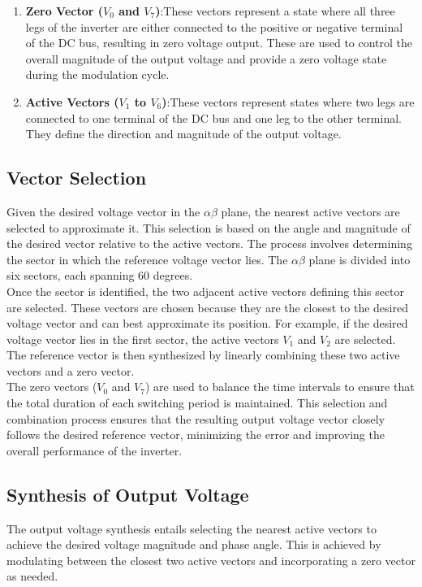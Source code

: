 \begin{enumerate}
    \item \textbf{Zero Vector ($V_0$ and $V_7$)}:These vectors represent a state where all three legs of the inverter are either connected to the positive or negative terminal of the DC bus, resulting in zero voltage output. These are used to control the overall magnitude of the output voltage and provide a zero voltage state during the modulation cycle.
    \item \textbf{Active Vectors ($V_1$ to $V_6$)}:These vectors represent states where two legs are connected to one terminal of the DC bus and one leg to the other terminal. They define the direction and magnitude of the output voltage.
\end{enumerate}

\subsection{Vector Selection}
Given the desired voltage vector in the $\alpha\beta$ plane, the nearest active
vectors are selected to approximate it. This selection is based on the angle
and magnitude of the desired vector relative to the active vectors. The process
involves determining the sector in which the reference voltage vector lies. The
$\alpha\beta$ plane is divided into six sectors, each spanning 60 degrees.\\

Once the sector is identified, the two adjacent active vectors defining this
sector are selected. These vectors are chosen because they are the closest to
the desired voltage vector and can best approximate its position. For example,
if the desired voltage vector lies in the first sector, the active vectors
$V_1$ and $V_2$ are selected. The reference vector is then synthesized by
linearly combining these two active vectors and a zero vector.\\

The zero vectors ($V_0$ and $V_7$) are used to balance the time intervals to
ensure that the total duration of each switching period is maintained. This
selection and combination process ensures that the resulting output voltage
vector closely follows the desired reference vector, minimizing the error and
improving the overall performance of the inverter.

\subsection{Synthesis of Output Voltage}
The output voltage synthesis entails selecting the nearest active vectors to
achieve the desired voltage magnitude and phase angle. This is achieved by
modulating between the closest two active vectors and incorporating a zero
vector as needed.

